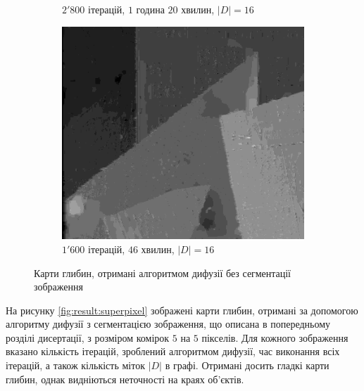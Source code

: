 \begin{figure}[h]
\begin{subfigure}[t]{0.32\textwidth}
        \caption{$2'800$ ітерацій, $1$ година $20$ хвилин, $\left| D \right| = 16$}
        \label{fig:flowerpots:pixel}
    \end{subfigure}
    \hfill
    \begin{subfigure}[t]{0.32\textwidth}
        \centering
        \includegraphics[width=\textwidth]{images/poster_pixel_based_stereo}
        \caption{$1'600$ ітерацій, $46$ хвилин, $\left| D \right| = 16$}
        \label{fig:poster:pixel}
    \end{subfigure}
    \caption{Карти глибин, отримані алгоритмом дифузії без сегментації зображення}
    \label{fig:result:pixel}
\end{figure}

На рисунку \ref{fig:result:superpixel} зображені карти глибин,
отримані за допомогою алгоритму дифузії з сегментацією зображення,
що описана в попередньому розділі дисертації,
з розміром комірок $5$ на $5$ пікселів.
Для кожного зображення вказано кількість ітерацій, зроблений алгоритмом дифузії,
час виконання всіх ітерацій, а також кількість міток $\left| D \right|$ в графі.
Отримані досить гладкі карти глибин,
однак видніються неточності на краях об'єктів.

